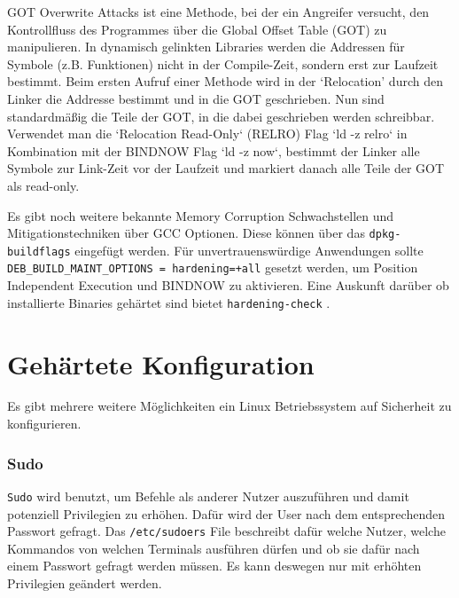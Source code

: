 
GOT Overwrite Attacks ist eine Methode, bei der ein Angreifer versucht, den Kontrollfluss des Programmes über die Global Offset Table (GOT) zu manipulieren. In dynamisch gelinkten Libraries werden die Addressen für Symbole (z.B. Funktionen) nicht in der Compile-Zeit, sondern erst zur Laufzeit bestimmt. Beim ersten Aufruf einer Methode wird in der `Relocation' durch den Linker die Addresse bestimmt und in die GOT geschrieben. Nun sind standardmäßig die Teile der GOT, in die dabei geschrieben werden schreibbar. 
Verwendet man die `Relocation Read-Only` (RELRO) Flag `ld -z relro` in Kombination mit der BINDNOW Flag `ld -z now`, bestimmt der Linker alle Symbole zur Link-Zeit vor der Laufzeit und markiert danach alle Teile der GOT als read-only. \cite{relro}

Es gibt noch weitere bekannte Memory Corruption Schwachstellen und Mitigationstechniken über GCC Optionen. Diese können über das \texttt{dpkg-buildflags} eingefügt werden. Für unvertrauenswürdige Anwendungen sollte \texttt{DEB\_BUILD\_MAINT\_OPTIONS = hardening=+all} gesetzt werden, um Position Independent Execution und BINDNOW zu aktivieren. Eine Auskunft darüber ob installierte Binaries gehärtet sind bietet \texttt{hardening-check} \cite{debian-hardening}. 


\section{Gehärtete Konfiguration}

Es gibt mehrere weitere Möglichkeiten ein Linux Betriebssystem auf Sicherheit zu konfigurieren.

\subsubsection{Sudo}

\texttt{Sudo} wird benutzt, um Befehle als anderer Nutzer auszuführen und damit potenziell Privilegien zu erhöhen. Dafür wird der User nach dem entsprechenden Passwort gefragt. Das \texttt{/etc/sudoers} File beschreibt dafür welche Nutzer, welche Kommandos von welchen Terminals ausführen dürfen und ob sie dafür nach einem Passwort gefragt werden müssen. Es kann deswegen nur mit erhöhten Privilegien geändert werden. \cite{man-sudo}

